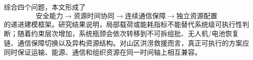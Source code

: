 \documentclass[UTF8,a4paper,12pt]{ctexart}
\begin{document}
综合四个问题，本文形成了
\[
\boxed{
\text{安全能力}
\rightarrow
\text{资源时间协同}
\rightarrow
\text{连续通信保障}
\rightarrow
\text{独立资源配置}
}
\]
的递进建模框架。研究结果说明，局部载荷或能耗指标不能替代系统级可执行性判断；随着约束层次增加，系统瓶颈会依次转移到不可拆组批、无人机/电池恢复链、通信保障切换以及异构资源结构。对山区洪涝救援而言，真正可执行的方案应同时保证运输、能源、通信和组织资源在同一时间轴上相互兼容。



\clearpage
\renewcommand{\refname}{参考文献}



\clearpage
\appendix

\end{document}
